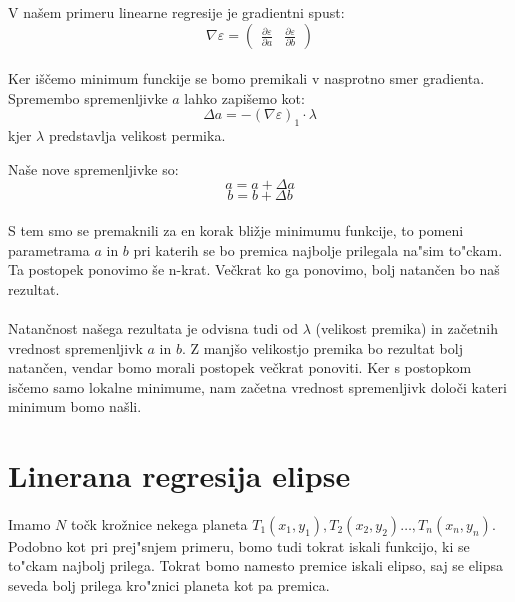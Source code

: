 \documentclass[a4paper, 12pt]{article}
\begin{document}
	V našem primeru linearne regresije je gradientni spust:
	$$\nabla \varepsilon =
	\begin{pmatrix}
	\frac{\partial \varepsilon}{\partial a} &
	\frac{\partial \varepsilon}{\partial b} 
	\end{pmatrix}$$
	
	\paragraph{}
	Ker iščemo minimum funckije se bomo premikali v nasprotno smer gradienta. Spremembo spremenljivke $a$ lahko zapišemo kot:
	$$\Delta a = -(\nabla \varepsilon)_1 \cdot \lambda$$
	kjer $\lambda$ predstavlja velikost permika.
	
	Naše nove spremenljivke so:
	$$ a = a + \Delta a$$
	$$ b = b + \Delta b$$
	
	\paragraph{}
	S tem smo se premaknili za en korak bližje minimumu funkcije, to pomeni parametrama $a$ in $b$ pri katerih se bo premica najbolje prilegala na"sim to"ckam. Ta postopek ponovimo še n-krat. Večkrat ko ga ponovimo, bolj natančen bo naš rezultat.
	
	\paragraph{}
	Natančnost našega rezultata je odvisna tudi od $\lambda$ (velikost premika) in začetnih vrednost spremenljivk $a$ in $b$. Z manjšo velikostjo premika bo rezultat bolj natančen, vendar bomo morali postopek večkrat ponoviti. Ker s postopkom isčemo samo lokalne minimume, nam začetna vrednost spremenljivk določi kateri minimum bomo našli.


	\section*{Linerana regresija elipse}
	\paragraph{}
	Imamo $N$ točk krožnice nekega planeta $T_1(x_1, y_1), T_2(x_2, y_2) \ldots, T_n(x_n, y_n)$. Podobno kot pri prej"snjem primeru, bomo tudi tokrat iskali funkcijo, ki se to"ckam najbolj prilega. Tokrat bomo namesto premice iskali elipso, saj se elipsa seveda bolj prilega kro"znici planeta kot pa premica.
	
\end{document}
